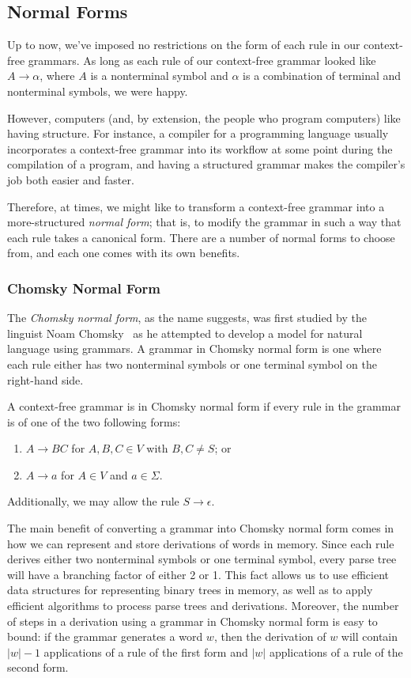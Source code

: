\subsection{Normal Forms}

Up to now, we've imposed no restrictions on the form of each rule in our context-free grammars. As long as each rule of our context-free grammar looked like $A \rightarrow \alpha$, where $A$ is a nonterminal symbol and $\alpha$ is a combination of terminal and nonterminal symbols, we were happy.

However, computers (and, by extension, the people who program computers) like having structure. For instance, a compiler for a programming language usually incorporates a context-free grammar into its workflow at some point during the compilation of a program, and having a structured grammar makes the compiler's job both easier and faster.

Therefore, at times, we might like to transform a context-free grammar into a more-structured \emph{normal form}; that is, to modify the grammar in such a way that each rule takes a canonical form. There are a number of normal forms to choose from, and each one comes with its own benefits.

\subsubsection{Chomsky Normal Form}

The \emph{Chomsky normal form}, as the name suggests, was first studied by the linguist Noam Chomsky~\citeyearpar{Chomsky1959FormalPropertiesGrammars} as he attempted to develop a model for natural language using grammars. A grammar in Chomsky normal form is one where each rule either has two nonterminal symbols or one terminal symbol on the right-hand side.

\begin{definition}
A context-free grammar is in Chomsky normal form if every rule in the grammar is of one of the two following forms:
\begin{enumerate}
\item $A \rightarrow BC$ for $A, B, C \in V$ with $B, C \neq S$; or
\item $A \rightarrow a$ for $A \in V$ and $a \in \Sigma$.
\end{enumerate}
Additionally, we may allow the rule $S \rightarrow \epsilon$.
\end{definition}

The main benefit of converting a grammar into Chomsky normal form comes in how we can represent and store derivations of words in memory. Since each rule derives either two nonterminal symbols or one terminal symbol, every parse tree will have a branching factor of either 2 or 1. This fact allows us to use efficient data structures for representing binary trees in memory, as well as to apply efficient algorithms to process parse trees and derivations. Moreover, the number of steps in a derivation using a grammar in Chomsky normal form is easy to bound: if the grammar generates a word $w$, then the derivation of $w$ will contain $|w| - 1$ applications of a rule of the first form and $|w|$ applications of a rule of the second form.

